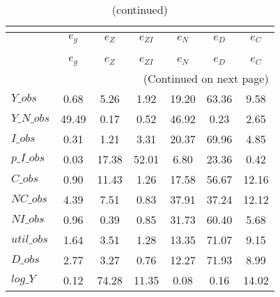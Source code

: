  
\begin{center}
\begin{longtable}{lcccccc} 
\caption{VARIANCE DECOMPOSITION (in percent)}\\
 \label{Table:th_var_decomp_uncond}\\
\toprule 
$           $	 & 	 $       {e_g}$	 & 	 $       {e_Z}$	 & 	 $    {e_{ZI}}$	 & 	 $       {e_N}$	 & 	 $       {e_D}$	 & 	 $       {e_C}$\\
\midrule \endfirsthead 
\caption{(continued)}\\
 \toprule \\ 
$           $	 & 	 $       {e_g}$	 & 	 $       {e_Z}$	 & 	 $    {e_{ZI}}$	 & 	 $       {e_N}$	 & 	 $       {e_D}$	 & 	 $       {e_C}$\\
\midrule \endhead 
\midrule \multicolumn{7}{r}{(Continued on next page)} \\ \bottomrule \endfoot 
\bottomrule \endlastfoot 
$Y\_obs     $	 & 	        0.68	 & 	        5.26	 & 	        1.92	 & 	       19.20	 & 	       63.36	 & 	        9.58 \\ 
$Y\_N\_obs  $	 & 	       49.49	 & 	        0.17	 & 	        0.52	 & 	       46.92	 & 	        0.23	 & 	        2.65 \\ 
$I\_obs     $	 & 	        0.31	 & 	        1.21	 & 	        3.31	 & 	       20.37	 & 	       69.96	 & 	        4.85 \\ 
$p\_I\_obs  $	 & 	        0.03	 & 	       17.38	 & 	       52.01	 & 	        6.80	 & 	       23.36	 & 	        0.42 \\ 
$C\_obs     $	 & 	        0.90	 & 	       11.43	 & 	        1.26	 & 	       17.58	 & 	       56.67	 & 	       12.16 \\ 
$NC\_obs    $	 & 	        4.39	 & 	        7.51	 & 	        0.83	 & 	       37.91	 & 	       37.24	 & 	       12.12 \\ 
$NI\_obs    $	 & 	        0.96	 & 	        0.39	 & 	        0.85	 & 	       31.73	 & 	       60.40	 & 	        5.68 \\ 
$util\_obs  $	 & 	        1.64	 & 	        3.51	 & 	        1.28	 & 	       13.35	 & 	       71.07	 & 	        9.15 \\ 
$D\_obs     $	 & 	        2.77	 & 	        3.27	 & 	        0.76	 & 	       12.27	 & 	       71.93	 & 	        8.99 \\ 
$log\_Y     $	 & 	        0.12	 & 	       74.28	 & 	       11.35	 & 	        0.08	 & 	        0.16	 & 	       14.02 \\ 

\end{longtable}
\end{center}
